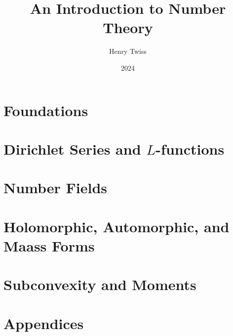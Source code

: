 \documentclass[12pt,oneside]{book}
\title{An Introduction to Number Theory}
\author{Henry Twiss}
\date{2024}
\begin{document}
\maketitle
\pagestyle{empty}
\tableofcontents
\setcounter{page}{0}
\pagestyle{fancy}

\part{Foundations}
  

\part{Dirichlet Series and \texorpdfstring{$L$}{L}-functions}
  
  
  

\part{Number Fields}
  
  
  
  

\part{Holomorphic, Automorphic, and Maass Forms}
  
  
  
  
  

\part{Subconvexity and Moments}
  
  
  

\part{Appendices}
  

\printindex


\end{document}
